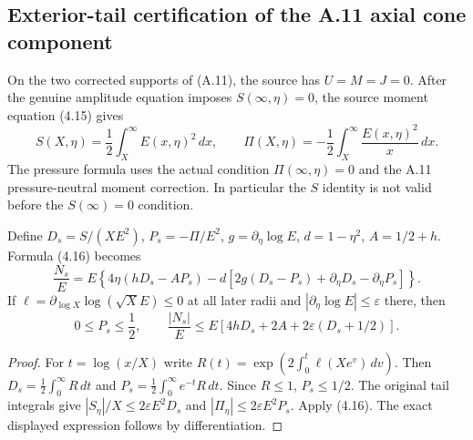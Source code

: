 \subsection*{Exterior-tail certification of the A.11 axial cone component}
\label{subsec:A11-actual-Ns-tail}
On the two corrected supports of (A.11), the source has $U=M=J=0$.
After the genuine amplitude equation imposes $S(\infty,\eta)=0$, the source
moment equation (4.15) gives
\begin{equation}\label{eq:A11-tail-SP}
 S(X,\eta)=\frac12\int_X^\infty E(x,\eta)^2\,dx,\qquad
 \Pi(X,\eta)=-\frac12\int_X^\infty\frac{E(x,\eta)^2}{x}\,dx.
\end{equation}
The pressure formula uses the actual condition $\Pi(\infty,\eta)=0$
and the A.11 pressure-neutral moment correction. In particular
the $S$ identity is not valid before the $S(\infty)=0$ condition.

\begin{lemma}
Define $D_s=S/(XE^2)$, $P_s=-\Pi/E^2$, $g=\partial_\eta\log E$,
$d=1-\eta^2$, $A=1/2+h$. Formula (4.16) becomes
\begin{equation}\label{eq:A11-Ns-tail-exact}
 \frac{N_s}{E}=E\left\{4\eta(hD_s-AP_s)
 -d[2g(D_s-P_s)+\partial_\eta D_s-\partial_\eta P_s]\right\}.
\end{equation}
If $\ell=\partial_{\log X}\log(\sqrt X E)\le0$ at all later radii
and $|\partial_\eta\log E|\le\varepsilon$ there, then
\begin{equation}\label{eq:A11-Ns-tail-inequality}
0\le P_s\le\frac12,\qquad
\frac{|N_s|}{E}\le E[4hD_s+2A+2\varepsilon(D_s+1/2)].
\end{equation}
\end{lemma}
\begin{proof}
For $t=\log(x/X)$ write $R(t)=\exp(2\int_0^t\ell(Xe^v)\,dv)$.
Then $D_s=\frac12\int_0^\infty R\,dt$ and
$P_s=\frac12\int_0^\infty e^{-t}R\,dt$. Since $R\le1$, $P_s\le1/2$.
The original tail integrals give
$|S_\eta|/X\le2\varepsilon E^2D_s$ and
$|\Pi_\eta|\le2\varepsilon E^2P_s$. Apply (4.16).
The exact displayed expression follows by differentiation.
\end{proof}

